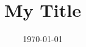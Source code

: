 \documentclass[11pt]{article}
\newcommand{\myname}{Lev Stambler}
\begin{document}
\title{My Title}


\date{\today}
\maketitle



\begin{abstract}
\end{abstract}



\end{document}
